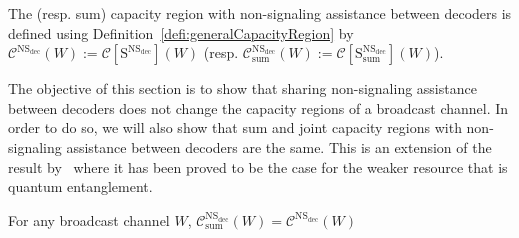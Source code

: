 The (resp. sum) capacity region with non-signaling assistance between decoders is defined using Definition~\ref{defi:generalCapacityRegion} by $\mathcal{C}^{\mathrm{NS}_{\text{dec}}}(W) := \mathcal{C}[\mathrm{S}^{\mathrm{NS}_{\text{dec}}}](W)$ (resp. $\mathcal{C}^{\mathrm{NS}_{\text{dec}}}_{\text{sum}}(W) := \mathcal{C}[\mathrm{S}_{\text{sum}}^{\mathrm{NS}_{\text{dec}}}](W)$).


The objective of this section is to show that sharing non-signaling assistance between decoders does not change the capacity regions of a broadcast channel. In order to do so, we will also show that sum and joint capacity regions with non-signaling assistance between decoders are the same. This is an extension of the result by~\cite{PDB21} where it has been proved to be the case for the weaker resource that is quantum entanglement.

\begin{proposition}
  \label{prop:NSdecoderssum}
  For any broadcast channel $W$, $\mathcal{C}_{\text{sum}}^{\mathrm{NS}_{\text{dec}}}(W)= \mathcal{C}^{\mathrm{NS}_{\text{dec}}}(W)$
\end{proposition}

